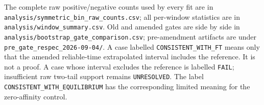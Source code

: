 \documentclass[10pt]{article}
\begin{document}
The complete raw positive/negative counts used by every fit are in
\texttt{analysis/symmetric\_bin\_raw\_counts.csv}; all per-window statistics
are in \texttt{analysis/window\_summary.csv}.  Old and amended gates are side
by side in \nolinkurl{analysis/bootstrap_gate_comparison.csv}; pre-amendment
artifacts are under \nolinkurl{pre_gate_respec_2026-09-04/}.  A case labelled
\texttt{CONSISTENT\_WITH\_FT} means only that the amended reliable-time
extrapolated interval includes the reference.  It is not a proof.  A case
whose interval excludes the reference is labelled \texttt{FAIL};
insufficient raw two-tail support remains \texttt{UNRESOLVED}.  The label
\texttt{CONSISTENT\_WITH\_EQUILIBRIUM} has the corresponding limited meaning
for the zero-affinity control.
\end{document}
